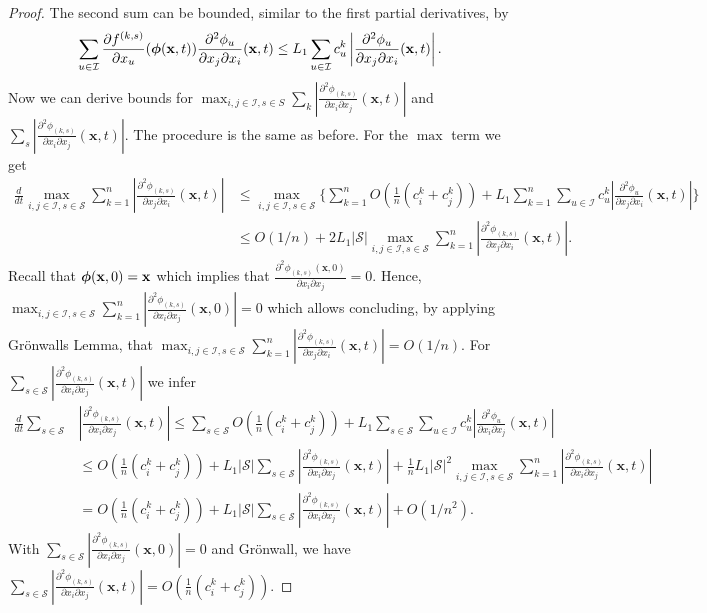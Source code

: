 \documentclass[acmsmall]{acmart}
\newcommand\bx{\mathbf{x}}
\newcommand\bphi{\text{\boldmath$\phi$}}
\newcommand\calI{\mathcal{I}}
\newcommand\calS{\mathcal{S}}
\newcommand\abs[1]{\left|#1\right|}         %
\newcommand{\dd}[3]{ \frac{\partial^2 #1 }{ \partial x_{#2} \partial x_{#3}}}
\begin{document}
\begin{proof}
The second sum can be bounded, similar to the first partial derivatives, by
\begin{align*}
\sum_{u \in \calI} \frac{\partial f^{(k,s)}}{\partial x_u}(\bphi (\bx,t)) \dd{\phi_u}{j}{i}(\bx,t) \leq L_{1} \sum_{u\in \calI} c_u^k\abs{\dd{\phi_{u} }{j}{i}(\bx,t)} .
\end{align*}
Now we can derive bounds for $\max_{i,j \in \calI, s\in S} \sum_k \abs{\dd{\phi_{(k,s)}}{i}{j}(\bx,t)}$ and $\sum_{s} \abs{\dd{\phi_{(k,s)}}{i}{j}(\bx,t)}$. The procedure is the same as before. For the $\max$ term we get
\begin{align*}
\frac{d}{dt}\max_{i,j\in\calI, s\in \calS} \sum_{k=1}^{n} \abs{\frac{\partial^2 \phi_{(k,s)}}{\partial x_j\partial x_i}(\bx, t) } & \leq \max_{i,j\in\calI, s\in \calS} \{\sum_{k=1}^{n} O(\frac{1}{n}(c^k_i + c^k_j)) + L_{1} \sum_{k=1}^{n}\sum_{u\in \calI} c_u^k\abs{\dd{\phi_{u} }{j}{i}(\bx,t)}\} \\
& \leq O(1/n) + 2L_{1}\abs{\calS} \max_{i,j\in\calI, s\in \calS} \sum_{k=1}^{n} \abs{\frac{\partial^2 \phi_{(k,s)}}{\partial x_j\partial x_i}(\bx, t)}.
\end{align*} 
Recall that $\bphi(\bx, 0)=\bx$ which implies that $\frac{\partial^2 \phi_{(k,s)}(\bx, 0)}{\partial x_{i}\partial x_j}=0$.  Hence, $\max_{i,j\in\calI, s\in \calS} \sum_{k=1}^{n} \abs{\frac{\partial^2 \phi_{(k,s)}}{\partial x_i\partial x_j}(\bx, 0) } = 0$ which allows concluding, by applying Grönwalls Lemma, that
$\max_{i,j\in\calI, s\in \calS} \sum_{k=1}^{n} \abs{\frac{\partial^2 \phi_{(k,s)}}{\partial x_j\partial x_i}(\bx, t) } = O(1/n)$.
For $\sum_{s\in\calS} \abs{\dd{\phi_{(k,s)}}{i}{j}(\bx,t)}$ we infer
\begin{align*}
\frac{d}{dt}\sum_{s\in\calS} & \abs{\dd{\phi_{(k,s)}}{i}{j}(\bx,t)} \leq \sum_{s\in \calS} O(\frac{1}{n}(c^k_i + c^k_j)) + L_{1} \sum_{s\in\calS}\sum_{u\in \calI} c_u^k\abs{\dd{\phi_{u} }{i}{j}(\bx,t)} \\
& \leq O(\frac{1}{n}(c^k_i + c^k_j)) + L_{1}\abs{\calS} \sum_{s\in \calS} \abs{\dd{\phi_{(k,s)}}{i}{j}(\bx,t)} + \frac{1}{n}L_{1}\abs{\calS}^2 \max_{i,j\in\calI, s\in \calS} \sum_{k=1}^{n} \abs{\frac{\partial^2 \phi_{(k,s)}}{\partial x_i\partial x_j}(\bx, t)} \\
& = O(\frac{1}{n}(c^k_i + c^k_j)) + L_{1}\abs{\calS} \sum_{s\in \calS} \abs{\dd{\phi_{(k,s)}}{i}{j}(\bx,t)} + O(1/n^2).
\end{align*}
With $\sum_{s\in\calS} \abs{\dd{\phi_{(k,s)}}{i}{j}(\bx,0)} = 0$ and Grönwall, we have $\sum_{s\in\calS} \abs{\dd{\phi_{(k,s)}}{i}{j}(\bx,t)} = O(\frac{1}{n}(c^k_i + c^k_j))$. 


\end{proof}
\end{document}

